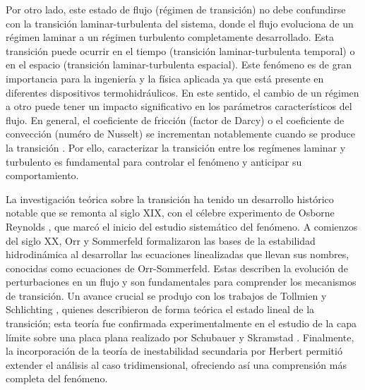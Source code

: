 Por otro lado, este estado de flujo (régimen de transición) no debe confundirse con la transición laminar-turbulenta del sistema, donde el flujo evoluciona de un régimen laminar a un régimen turbulento completamente desarrollado. Esta transición puede ocurrir en el tiempo (transición laminar-turbulenta temporal) o en el espacio (transición laminar-turbulenta espacial). Este fenómeno es de gran importancia para la ingeniería y la física aplicada ya que está presente en diferentes dispositivos termohidráulicos. En este sentido, el cambio de un régimen a otro puede tener un impacto significativo en los parámetros característicos del flujo. En general, el coeficiente de fricción (factor de Darcy) o el coeficiente de convección (numéro de Nusselt) se incrementan notablemente cuando se produce la transición \cite{incropera,white}. Por ello, caracterizar la transición entre los regímenes laminar y turbulento es fundamental para controlar el fenómeno y anticipar su comportamiento. 

La investigación teórica sobre la transición ha tenido un desarrollo histórico notable que se remonta al siglo XIX, con el célebre experimento de Osborne Reynolds \cite{reynolds1883}, que marcó el inicio del estudio sistemático del fenómeno. A comienzos del siglo XX, Orr \cite{orr1907} y Sommerfeld \cite{sommerfeld1908} formalizaron las bases de la estabilidad hidrodinámica al desarrollar las ecuaciones linealizadas que llevan sus nombres, conocidas como ecuaciones de Orr-Sommerfeld. Estas describen la evolución de perturbaciones en un flujo y son fundamentales para comprender los mecanismos de transición. Un avance crucial se produjo con los trabajos de Tollmien \cite{tollmien1930} y Schlichting \cite{schlichting1933}, quienes describieron de forma teórica el estado lineal de la transición; esta teoría fue confirmada experimentalmente en el estudio de la capa límite sobre una placa plana realizado por Schubauer y Skramstad \cite{schubauer1947laminar}. Finalmente, la incorporación de la teoría de inestabilidad secundaria por Herbert \cite{herbert1983secondary} permitió extender el análisis al caso tridimensional, ofreciendo así una comprensión más completa del fenómeno. 


